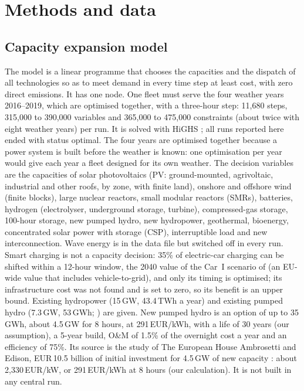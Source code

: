 \section{Methods and data}\label{sec:methods}

\subsection{Capacity expansion model}\label{sec:model}
The model is a linear programme that chooses the capacities and the dispatch of all technologies so as to meet demand in every time step at least cost, with zero direct emissions. It has one node. One fleet must serve the four weather years 2016--2019, which are optimised together, with a three-hour step: 11{,}680 steps, 315{,}000 to 390{,}000 variables and 365{,}000 to 475{,}000 constraints (about twice with eight weather years) per run. It is solved with HiGHS \citep{HiGHS}; all runs reported here ended with status optimal. The four years are optimised together because a power system is built before the weather is known: one optimisation per year would give each year a fleet designed for its own weather. The decision variables are the capacities of solar photovoltaics (PV: ground-mounted, agrivoltaic, industrial and other roofs, by zone, with finite land), onshore and offshore wind (finite blocks), large nuclear reactors, small modular reactors (SMRs), batteries, hydrogen (electrolyser, underground storage, turbine), compressed-gas storage, 100-hour storage, new pumped hydro, new hydropower, geothermal, bioenergy, concentrated solar power with storage (CSP), interruptible load and new interconnection. Wave energy is in the data file but switched off in every run. Smart charging is not a capacity decision: 35\% of electric-car charging can be shifted within a 12-hour window, the 2040 value of the Car~I scenario of \citet{TandE2024} (an EU-wide value that includes vehicle-to-grid), and only its timing is optimised; its infrastructure cost was not found and is set to zero, so its benefit is an upper bound. Existing hydropower (15\,GW, 43.4\,TWh a year) and existing pumped hydro (7.3\,GW, 53\,GWh; \citealp{TernaStato2025}) are given. New pumped hydro is an option of up to 35\,GWh, about 4.5\,GW for 8 hours, at 291\,EUR/kWh, with a life of 30 years (our assumption), a 5-year build, O\&M of 1.5\% of the overnight cost a year and an efficiency of 75\%. Its source is the study of The European House Ambrosetti and Edison, EUR\,10.5 billion of initial investment for 4.5\,GW of new capacity \citep{EdisonPumped2023}: about 2{,}330\,EUR/kW, or 291\,EUR/kWh at 8 hours (our calculation). It is not built in any central run.

